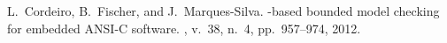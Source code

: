 \documentclass[a4paper]{llncs}
\begin{document}
{\begin{thebibliography}{10}
L.~Cordeiro, B.~Fischer, and J.~Marques-Silva.
-based bounded model checking for embedded {ANSI-C} software.
, v.\ 38, n.\ 4, pp.\ 957--974, 2012. 



\end{thebibliography}}
\end{document}
